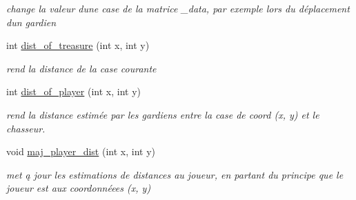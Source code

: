 \begin{DoxyCompactItemize}
\begin{DoxyCompactList}\small\item\em change la valeur d\textquotesingle{}une case de la matrice \+\_\+data, par exemple lors du déplacement d\textquotesingle{}un gardien \end{DoxyCompactList}\item 
int \hyperlink{classLabyrinthe_afed17fdb2dce31cb4671da03c05b88d7}{dist\+\_\+of\+\_\+treasure} (int x, int y)
\begin{DoxyCompactList}\small\item\em rend la distance de la case courante \end{DoxyCompactList}\item 
int \hyperlink{classLabyrinthe_a66e8fffb2a5acb505b860174f66a3456}{dist\+\_\+of\+\_\+player} (int x, int y)
\begin{DoxyCompactList}\small\item\em rend la distance estimée par les gardiens entre la case de coord (x, y) et le chasseur. \end{DoxyCompactList}\item 
void \hyperlink{classLabyrinthe_ac0aee40381eb415bccaa2f9ca2e3d0c4}{maj\+\_\+player\+\_\+dist} (int x, int y)
\begin{DoxyCompactList}\small\item\em met ą jour les estimations de distances au joueur, en partant du principe que le joueur est aux coordonnéees (x, y) \end{DoxyCompactList}\end{DoxyCompactItemize}
